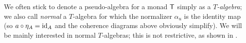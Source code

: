 \begin{remark}
We often stick to denote a pseudo-algebra for a monad $\textsf{T}$ simply as a \emph{$T$-algebra}; we also call \emph{normal} a $T$-algebra for which the normalizer $\alpha_u$ is the identity map (so $a\circ \eta_A = \operatorname{id}_A$ and the coherence diagrams above obviously simplify). We will be mainly interested in normal $T$-algebras; this is not restrictive, as shown in .
\end{remark}
%
